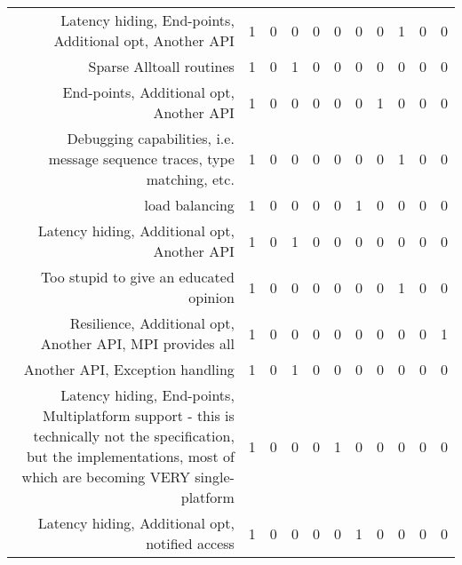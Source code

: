 {\begin{landscape}
\begin{longtable}[htb]{r|c|c|c|c|c|c|c|c|c|c}
{Latency hiding, End-points, Additional opt, Another API} & 1 & 0 & 0 & 0 & 0 & 0 & 0 & 1 & 0 & 0 \\%
{Sparse Alltoall routines} & 1 & 0 & 1 & 0 & 0 & 0 & 0 & 0 & 0 & 0 \\%
{End-points, Additional opt, Another API} & 1 & 0 & 0 & 0 & 0 & 0 & 1 & 0 & 0 & 0 \\%
{Debugging capabilities, i.e. message sequence traces, type matching, etc.} & 1 & 0 & 0 & 0 & 0 & 0 & 0 & 1 & 0 & 0 \\%
{load balancing} & 1 & 0 & 0 & 0 & 0 & 1 & 0 & 0 & 0 & 0 \\%
{Latency hiding, Additional opt, Another API} & 1 & 0 & 1 & 0 & 0 & 0 & 0 & 0 & 0 & 0 \\%
{Too stupid to give an educated opinion} & 1 & 0 & 0 & 0 & 0 & 0 & 0 & 1 & 0 & 0 \\%
{Resilience, Additional opt, Another API, MPI provides all} & 1 & 0 & 0 & 0 & 0 & 0 & 0 & 0 & 0 & 1 \\%
{Another API, Exception handling} & 1 & 0 & 1 & 0 & 0 & 0 & 0 & 0 & 0 & 0 \\%
{Latency hiding, End-points, Multiplatform support - this is technically not the specification, but the implementations, most of which are becoming VERY single-platform} & 1 & 0 & 0 & 0 & 1 & 0 & 0 & 0 & 0 & 0 \\%
{Latency hiding, Additional opt, notified access} & 1 & 0 & 0 & 0 & 0 & 1 & 0 & 0 & 0 & 0 \\%
\hline%
\end{longtable}%
\end{landscape}}%
\clearpage%
